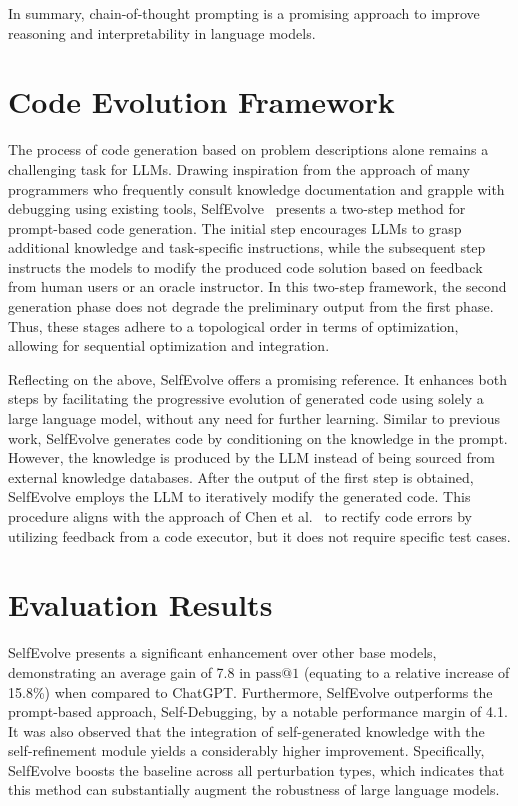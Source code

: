 \documentclass[a4paper,oneside]{book}
\begin{document}
In summary, chain-of-thought prompting is a promising approach to improve reasoning and interpretability in language models.

\section{Code Evolution Framework}
The process of code generation based on problem descriptions alone remains a challenging task for LLMs. Drawing inspiration from the approach of many programmers who frequently consult knowledge documentation and grapple with debugging using existing tools, SelfEvolve~\cite{jiang2023selfevolve} presents a two-step method for prompt-based code generation. The initial step encourages LLMs to grasp additional knowledge and task-specific instructions, while the subsequent step instructs the models to modify the produced code solution based on feedback from human users or an oracle instructor. In this two-step framework, the second generation phase does not degrade the preliminary output from the first phase. Thus, these stages adhere to a topological order in terms of optimization, allowing for sequential optimization and integration.

Reflecting on the above, SelfEvolve offers a promising reference. It enhances both steps by facilitating the progressive evolution of generated code using solely a large language model, without any need for further learning. Similar to previous work, SelfEvolve generates code by conditioning on the knowledge in the prompt. However, the knowledge is produced by the LLM instead of being sourced from external knowledge databases. After the output of the first step is obtained, SelfEvolve employs the LLM to iteratively modify the generated code. This procedure aligns with the approach of Chen et al.~\cite{chen2023teaching} to rectify code errors by utilizing feedback from a code executor, but it does not require specific test cases.

\section{Evaluation Results}
SelfEvolve presents a significant enhancement over other base models, demonstrating an average gain of 7.8 in $\text{pass@1}$ (equating to a relative increase of 15.8\%) when compared to ChatGPT. Furthermore, SelfEvolve outperforms the prompt-based approach, Self-Debugging, by a notable performance margin of 4.1. It was also observed that the integration of self-generated knowledge with the self-refinement module yields a considerably higher improvement. Specifically, SelfEvolve boosts the baseline across all perturbation types, which indicates that this method can substantially augment the robustness of large language models.
\end{document}
